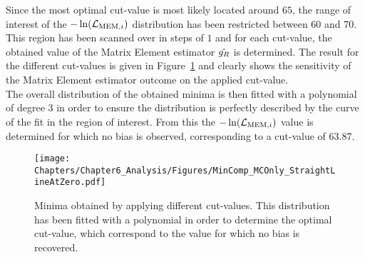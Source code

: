 Since the most optimal cut-value is most likely located around $65$, the range of interest of the $-\ln(\mathcal{L}_{\textrm{MEM}, i})$ distribution has been restricted between 60 and 70.
This region has been scanned over in steps of $1$ and for each cut-value, the obtained value of the Matrix Element estimator $\hat{g_{R}}$ is determined.  %
The result for the different cut-values is given in Figure~\ref{fig::CutValueFit} and clearly shows the sensitivity of the Matrix Element estimator outcome on the applied cut-value.
\\
The overall distribution of the obtained minima is then fitted with a polynomial of degree $3$ in order to ensure the distribution is perfectly described by the curve of the fit in the region of interest.
From this the $-\ln(\mathcal{L}_{\textrm{MEM}, i})$ value is determined for which no bias is observed, corresponding to a cut-value of $63.87$.
\\
\begin{figure}[h!t]
 \centering
 \texttt{[image: Chapters/Chapter6\_Analysis/Figures/MinComp\_MCOnly\_StraightLineAtZero.pdf]}  %
 \caption{Minima obtained by applying different cut-values. This distribution has been fitted with a polynomial in order to determine the optimal cut-value, which correspond to the value for which no bias is recovered.} \label{fig::CutValueFit}
\end{figure}

